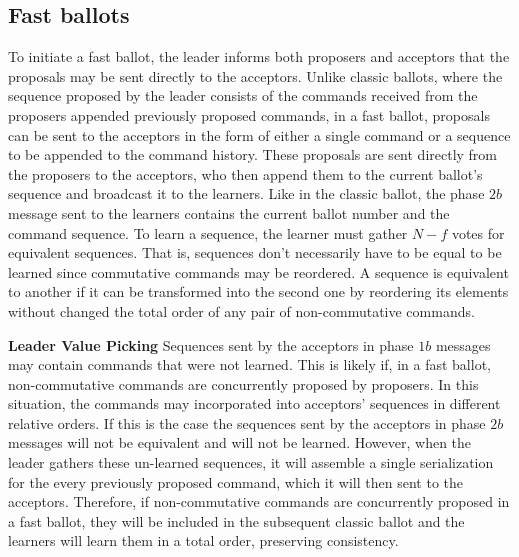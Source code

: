 \subsection{Fast ballots} 

To initiate a fast ballot, the leader informs both proposers and acceptors that the proposals may be sent directly to the acceptors.  Unlike classic ballots, where the sequence proposed by the leader consists of the commands received from the proposers appended previously proposed commands, in a fast ballot, proposals can be sent to the acceptors in the form of either a single command or a sequence to be appended to the command history. These proposals are sent directly from the proposers to the acceptors, who then append them to the current ballot's sequence and broadcast it to the learners. Like in the classic ballot, the phase $2b$ message sent to the learners contains the current ballot number and the command sequence. To learn a sequence, the learner must gather $N-f$ votes for equivalent sequences. That is, sequences don't necessarily have to be equal to be learned since commutative commands may be reordered. A sequence is equivalent to another if it can be transformed into the second one by reordering its elements without changed the total order of any pair of non-commutative commands.


\textbf{Leader Value Picking} Sequences sent by the acceptors in phase $1b$ messages may contain commands that were not learned. This is likely if, in a fast ballot, non-commutative commands are  concurrently proposed by proposers. In this situation, the commands may incorporated into acceptors' sequences in different relative orders. If this is the case the sequences sent by the acceptors in phase $2b$ messages will not be equivalent and will not be learned. However, when the leader gathers these un-learned sequences, it will assemble a single serialization for the every previously proposed command, which it will then sent to the acceptors. Therefore, if non-commutative commands are concurrently proposed in a fast ballot, they will be included in the subsequent classic ballot and the learners will learn them in a total order, preserving consistency.
